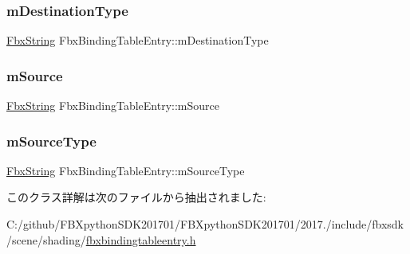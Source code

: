 \subsubsection{\texorpdfstring{m\+Destination\+Type}{mDestinationType}}
{\footnotesize\ttfamily \hyperlink{class_fbx_string}{Fbx\+String} Fbx\+Binding\+Table\+Entry\+::m\+Destination\+Type\hspace{0.3cm}{\ttfamily [protected]}}

\mbox{\label{class_fbx_binding_table_entry_a9fe2b8742a77e290a15287b4dbc1df74}} 
\subsubsection{\texorpdfstring{m\+Source}{mSource}}
{\footnotesize\ttfamily \hyperlink{class_fbx_string}{Fbx\+String} Fbx\+Binding\+Table\+Entry\+::m\+Source\hspace{0.3cm}{\ttfamily [protected]}}

\mbox{\label{class_fbx_binding_table_entry_ad2f8a7934ffbeb6eb7bc83fa5f5e8d06}} 
\subsubsection{\texorpdfstring{m\+Source\+Type}{mSourceType}}
{\footnotesize\ttfamily \hyperlink{class_fbx_string}{Fbx\+String} Fbx\+Binding\+Table\+Entry\+::m\+Source\+Type\hspace{0.3cm}{\ttfamily [protected]}}



このクラス詳解は次のファイルから抽出されました\+:\begin{DoxyCompactItemize}
\item 
C\+:/github/\+F\+B\+Xpython\+S\+D\+K201701/\+F\+B\+Xpython\+S\+D\+K201701/2017./include/fbxsdk/scene/shading/\hyperlink{fbxbindingtableentry_8h}{fbxbindingtableentry.\+h}\end{DoxyCompactItemize}
